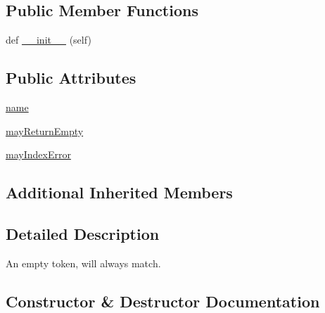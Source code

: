 \subsection*{Public Member Functions}
\begin{DoxyCompactItemize}
\item 
def \hyperlink{classpip_1_1__vendor_1_1pyparsing_1_1Empty_aac73873e1d44d69405a8cb761ebd678a}{\+\_\+\+\_\+init\+\_\+\+\_\+} (self)
\end{DoxyCompactItemize}
\subsection*{Public Attributes}
\begin{DoxyCompactItemize}
\item 
\hyperlink{classpip_1_1__vendor_1_1pyparsing_1_1Empty_a8b6e6e22c96235ccdeeba5789683cf71}{name}
\item 
\hyperlink{classpip_1_1__vendor_1_1pyparsing_1_1Empty_a1220286ef814e6ab1e917649454081e3}{may\+Return\+Empty}
\item 
\hyperlink{classpip_1_1__vendor_1_1pyparsing_1_1Empty_a63f53778d282281a35540bc45d66520e}{may\+Index\+Error}
\end{DoxyCompactItemize}
\subsection*{Additional Inherited Members}


\subsection{Detailed Description}
\begin{DoxyVerb}An empty token, will always match.
\end{DoxyVerb}
 

\subsection{Constructor \& Destructor Documentation}
\mbox{\label{classpip_1_1__vendor_1_1pyparsing_1_1Empty_aac73873e1d44d69405a8cb761ebd678a}} 
